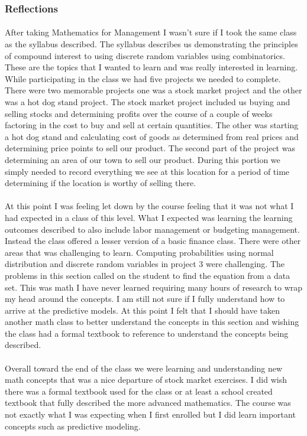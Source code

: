 \documentclass[12pt,titlepage]{article}
\begin{document}
\subsubsection{Reflections}
\paragraph {}
After taking Mathematics for Management I wasn't sure if I took the same class as the syllabus described. The syllabus describes us demonstrating the principles of compound interest to using discrete random variables using combinatorics. These are the topics that I wanted to learn and was really interested in learning. While participating in the class we had five projects we needed to complete. There were two memorable projects one was a stock market project and the other was a hot dog stand project. The stock market project included us buying and selling stocks and determining profits over the course of a couple of weeks factoring in the cost to buy and sell at certain quantities. The other was starting a hot dog stand and calculating cost of goods as determined from real prices and determining price points to sell our product. The second part of the project was determining an area of our town to sell our product. During this portion we simply needed to record everything we see at this location for a period of time determining if the location is worthy of selling there.
\paragraph {}
At this point I was feeling let down by the course feeling that it was not what I had expected in a class of this level. What I expected was learning the learning outcomes described to also include labor management or budgeting management. Instead the class offered a lesser version of a basic finance class. There were other areas that was challenging to learn. Computing probabilities using normal distribution and discrete random variables in project 3 were challenging. The problems in this section called on the student to find the equation from a data set. This was math I have never learned requiring many hours of research to wrap my head around the concepts. I am still not sure if I fully understand how to arrive at the predictive models. At this point I felt that I should have taken another math class to better understand the concepts in this section and wishing the class had a formal textbook to reference to understand the concepts being described.
\paragraph {}
Overall toward the end of the class we were learning and understanding new math concepts that was a nice departure of stock market exercises. I did wish there was a formal textbook used for the class or at least a school created textbook that fully described the more advanced mathematics. The course was not exactly what I was expecting when I first enrolled but I did learn important concepts such as predictive modeling.
\end{document}
